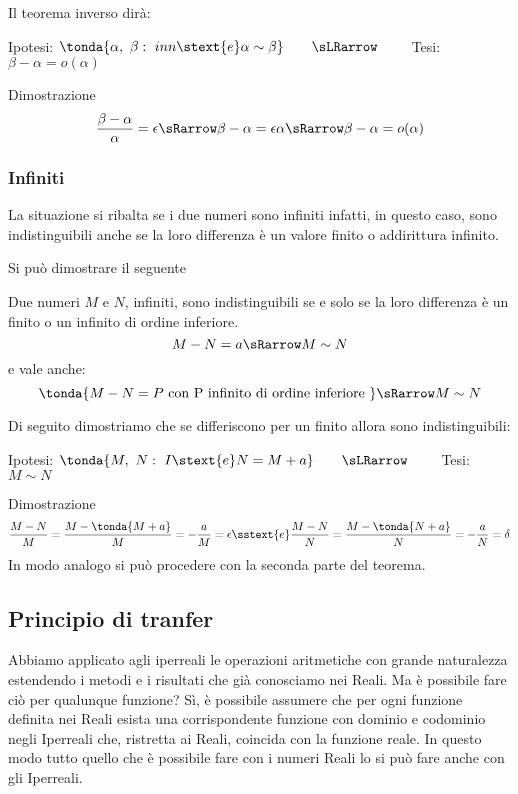 
Il teorema inverso dirà:
\begin{center}
Ipotesi: \(\tonda{\alpha,~\beta:\ inn \stext{e} \alpha \sim \beta}
\qquad \sLRarrow \qquad\) 
Tesi: \(\beta-\alpha = o(\alpha)\)
\end{center}
Dimostrazione
\[\frac{\beta - \alpha}{\alpha} = \epsilon \sRarrow 
\beta - \alpha =\epsilon \alpha \sRarrow 
\beta - \alpha = o(\alpha)
\]

\subsubsection{Infiniti}
\label{subsubsec:insnum_infiniti}

La situazione si ribalta se i due numeri sono infiniti infatti, in 
questo caso, sono indistinguibili anche se la loro differenza è 
un valore finito o addirittura infinito. 

Si può dimostrare il seguente
\begin{teorema}
Due numeri \(M\) e \(N\), infiniti, 
sono indistinguibili se e solo se la loro differenza è un finito o 
un infinito di ordine inferiore.
\[M-N = a \sRarrow M \sim N\] 
e vale anche:
\[\tonda{M-N = P \text{ con P infinito di ordine inferiore }} 
\sRarrow M \sim N\] 
\end{teorema}
Di seguito dimostriamo che se differiscono per un finito allora 
sono indistinguibili:
\begin{center}
Ipotesi: \(\tonda{M,~N:\ I \stext{e} N = M+a}
\qquad \sLRarrow\qquad\) 
Tesi: \(M \sim N\)
\end{center}
Dimostrazione
\[\frac{M-N}{M}=
\frac{M-\tonda{M +a}}{M} = 
-\frac{a}{M}= \epsilon \sstext{e} 
\frac{M-N}{N}=
\frac{M-\tonda{N +a}}{N} = 
-\frac{a}{N}= \delta
\]
In modo analogo si può procedere con la seconda parte del teorema.

\subsection{Principio di tranfer}
\label{subsec:transfer}

Abbiamo applicato agli iperreali le operazioni aritmetiche con grande 
naturalezza estendendo i metodi e i risultati che già conosciamo nei Reali. 
Ma è possibile fare ciò per qualunque funzione? 
Sì, è possibile assumere che per ogni funzione definita nei Reali esista 
una corrispondente funzione con dominio e codominio negli Iperreali che, 
ristretta ai Reali, coincida con la funzione reale.
In questo modo tutto quello che è possibile fare con i numeri Reali lo si 
può fare anche con gli Iperreali.

